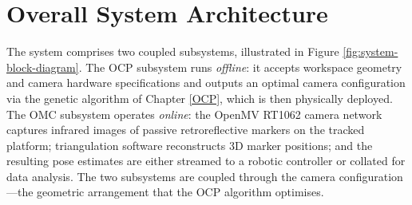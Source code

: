 \section{Overall System Architecture}

The system comprises two coupled subsystems, illustrated in Figure \ref{fig:system-block-diagram}. The \gls{OCP} subsystem runs \textit{offline}: it accepts workspace geometry and camera hardware specifications and outputs an optimal camera configuration via the genetic algorithm of Chapter \ref{OCP}, which is then physically deployed. The \gls{OMC} subsystem operates \textit{online}: the OpenMV RT1062 camera network captures infrared images of passive retroreflective markers on the tracked platform; triangulation software reconstructs 3D marker positions; and the resulting pose estimates are either streamed to a robotic controller or collated for data analysis. The two subsystems are coupled through the camera configuration---the geometric arrangement that the \gls{OCP} algorithm optimises.

